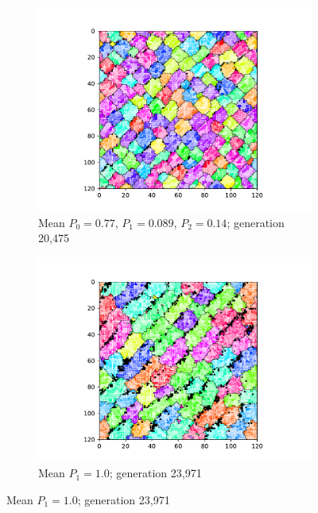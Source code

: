 \begin{figure}[t]
\begin{center}
\begin{subfigure}[b]{0.82\columnwidth}
  \includegraphics[width=\columnwidth,trim={2.5cm 0.5cm 2.5cm 1cm},clip]{img/ChannelMap_1022_update19500000}
  \caption{Mean $P_0 = 0.77$, $P_1 = 0.089$, $P_2 = 0.14$; generation 20,475}
  \label{fig:ChannelMap_1022}
\end{subfigure}

\begin{subfigure}[b]{0.82\columnwidth}
  \includegraphics[width=\columnwidth,trim={2.5cm 0.5cm 2.5cm 1cm},clip]{img/ChannelMap_1041_update19500000}
  \caption{Mean $P_1 = 1.0$; generation 23,971}
  \label{fig:ChannelMap_1041}
\end{subfigure}


\end{center}
\end{figure}
